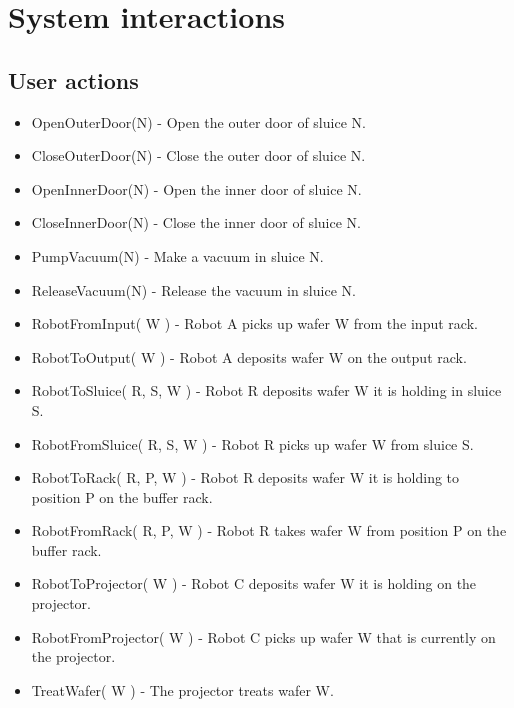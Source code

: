 \documentclass[12pt]{report}
\begin{document}
	\chapter{System interactions}
\section{User actions}
	\begin{itemize}
\item OpenOuterDoor(N) - Open the outer door of sluice N.
\item CloseOuterDoor(N) - Close the outer door of sluice N.
\item OpenInnerDoor(N) - Open the inner door of sluice N.
\item CloseInnerDoor(N) - Close the inner door of sluice N.
\item PumpVacuum(N) - Make a vacuum in sluice N.
\item ReleaseVacuum(N) - Release the vacuum in sluice N.

\item RobotFromInput( W ) - Robot A picks up wafer W from the input rack.
\item RobotToOutput( W ) - Robot A deposits wafer W on the output rack.

\item RobotToSluice( R, S, W ) - Robot R deposits wafer W it is holding in sluice S.
\item RobotFromSluice( R, S, W ) - Robot R picks up wafer W from sluice S.

\item RobotToRack( R, P, W ) - Robot R deposits wafer W it is holding to position P on the buffer rack.
\item RobotFromRack( R, P, W ) - Robot R takes wafer W from position P on the buffer rack.

\item RobotToProjector( W ) - Robot C deposits wafer W it is holding on the projector.
\item RobotFromProjector( W ) - Robot C picks up wafer W that is currently on the projector.

\item TreatWafer( W ) - The projector treats wafer W.
\end{itemize}
\end{document}

